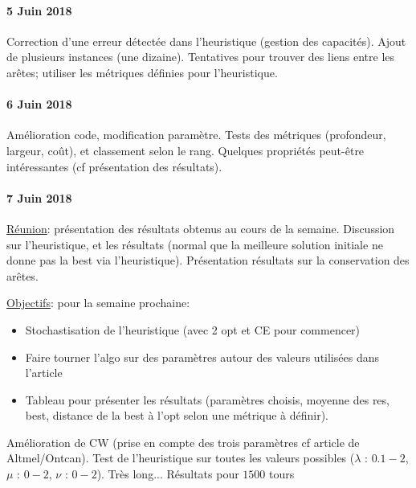 \documentclass[a4paper,11pt]{article}%
\begin{document}
\paragraph*{5 Juin 2018}
Correction d'une erreur détectée dans l'heuristique (gestion des capacités). Ajout de plusieurs instances (une dizaine). Tentatives pour trouver des liens entre les arêtes; utiliser les métriques définies pour l'heuristique.

\paragraph*{6 Juin 2018}
Amélioration code, modification paramètre. Tests des métriques (profondeur, largeur, coût), et classement selon le rang. Quelques propriétés peut-être intéressantes (cf présentation des résultats).

\paragraph*{7 Juin 2018}

\underline{Réunion}: présentation des résultats obtenus au cours de la semaine. Discussion sur l'heuristique, et les résultats (normal que la meilleure solution initiale ne donne pas la best via l'heuristique). Présentation résultats sur la conservation des arêtes. 

\underline{Objectifs}: pour la semaine prochaine:
\begin{itemize}
\item Stochastisation de l'heuristique (avec 2 opt et CE pour commencer)
\item Faire tourner l'algo sur des paramètres autour des valeurs utilisées dans l'article
\item Tableau pour présenter les résultats (paramètres choisis, moyenne des res, best, distance de la best à l'opt selon une métrique à définir).
\end{itemize}

Amélioration de CW (prise en compte des trois paramètres cf article de Altmel/Ontcan). Test de l'heuristique sur toutes les valeurs possibles ($\lambda$ : $0.1 - 2$, $\mu$ : $0 - 2$, $\nu$ : $0 - 2$). Très long... Résultats pour $1500$ tours 
\end{document}
